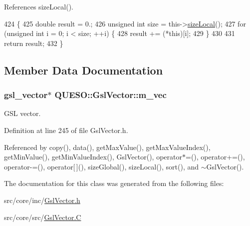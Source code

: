 References size\-Local().


\begin{DoxyCode}
424 \{
425   \textcolor{keywordtype}{double} result = 0.;
426   \textcolor{keywordtype}{unsigned} \textcolor{keywordtype}{int} size = this->\hyperlink{class_q_u_e_s_o_1_1_gsl_vector_ace6fb1739b7cf6456b3dcde84c766fb3}{sizeLocal}();
427   \textcolor{keywordflow}{for} (\textcolor{keywordtype}{unsigned} \textcolor{keywordtype}{int} i = 0; i < size; ++i) \{
428     result += (*this)[i];
429   \}
430 
431   \textcolor{keywordflow}{return} result;
432 \}
\end{DoxyCode}


\subsection{Member Data Documentation}
\hypertarget{class_q_u_e_s_o_1_1_gsl_vector_a503dd126017b7ac587ff511e8d0d833b}{
\subsubsection[{m\-\_\-vec}]{\setlength{\rightskip}{0pt plus 5cm}gsl\-\_\-vector$\ast$ Q\-U\-E\-S\-O\-::\-Gsl\-Vector\-::m\-\_\-vec\hspace{0.3cm}{\ttfamily [private]}}}\label{class_q_u_e_s_o_1_1_gsl_vector_a503dd126017b7ac587ff511e8d0d833b}


G\-S\-L vector. 



Definition at line 245 of file Gsl\-Vector.\-h.



Referenced by copy(), data(), get\-Max\-Value(), get\-Max\-Value\-Index(), get\-Min\-Value(), get\-Min\-Value\-Index(), Gsl\-Vector(), operator$\ast$=(), operator+=(), operator-\/=(), operator\mbox{[}$\,$\mbox{]}(), size\-Global(), size\-Local(), sort(), and $\sim$\-Gsl\-Vector().



The documentation for this class was generated from the following files\-:\begin{DoxyCompactItemize}
\item 
src/core/inc/\hyperlink{_gsl_vector_8h}{Gsl\-Vector.\-h}\item 
src/core/src/\hyperlink{_gsl_vector_8_c}{Gsl\-Vector.\-C}\end{DoxyCompactItemize}
